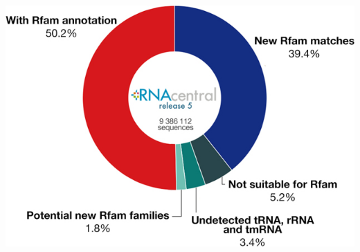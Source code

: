 \documentclass[landscape]{slides}
\begin{document}
\begin{slide}
\begin{center}
\includegraphics[height=7in]{figs/kalvari-2017-fig7}
\end{center}
\vfill
\tiny {}
\end{slide}
\end{document}
